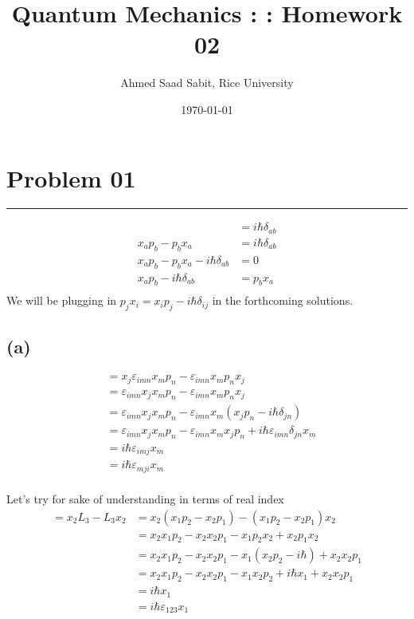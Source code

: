 \documentclass[letter, 10pts]{article}
\title{Quantum Mechanics : : Homework 02}
\author{Ahmed Saad Sabit, Rice University}
\date{\today}
\newcommand{\hb}{\hbar}
\begin{document}
\maketitle

\section*{Problem 01} 
\hrule 
\begin{align*}
	[x_a, p_b] &= i \hb \delta_{ab}  \\ 
x_a p_b - p_b x_a 		   &= i \hb \delta_{ab} \\
x_a p_b - p_b x_a 		   - i \hb \delta_{ab} &=  0 \\
x_a p_b  		   - i \hb \delta_{ab} &=  p_b x_a \\
\end{align*}
We will be plugging in $p_j x_i = x_i p_j - i \hb \delta_{ij} $ in the forthcoming solutions. 
\subsection*{(a)} 
\begin{align*}
	[x_j, L_i] &= 
	x_j \varepsilon_{imn} x_m p_n - 
	\varepsilon_{imn} x_m p_n x_j 
	\\
	&=  
	\varepsilon_{imn} x_j x_m p_n - 
	\varepsilon_{imn} x_m p_n x_j 
	\\
	&=  
	\varepsilon_{imn} x_j x_m p_n - 
	\varepsilon_{imn} x_m (x_j p_n - i \hb \delta_{jn})
	\\
	&=  
	\varepsilon_{imn} x_j x_m p_n - 
	\varepsilon_{imn} x_m x_j p_n + i \hb \varepsilon_{imn} \delta_{jn} x_m 
	\\ 
	&=  i \hb \varepsilon_{i m j} x_m  \\
	&=  i \hb \varepsilon_{m j i} x_m  \\
\end{align*}

Let's try for sake of understanding in terms of real index 
\begin{align*}
	[x_2, L_3] = x_2 L_3 - L_3 x_2  &= x_2 (x_1 p_2 - x_2 p_1 ) - (x_1 p_2 - x_2 p_1 ) x_2  \\
	&= x_2 x_1 p_2 - x_2 x_2 p_1 - x_1 p_2 x_2 + x_2 p_1 x_2  \\
	&= x_2 x_1 p_2 - x_2 x_2 p_1 - x_1 (x_2 p_2 - i \hb) + x_2 x_2 p_1   \\
	&= x_2 x_1 p_2 - x_2 x_2 p_1 - x_1 x_2 p_2 + i \hb x_1 + x_2 x_2 p_1   \\
	&= i \hb x_1  \\
	&= i \hb \varepsilon_{1 2 3}  x_1  \\
\end{align*}
\end{document}
